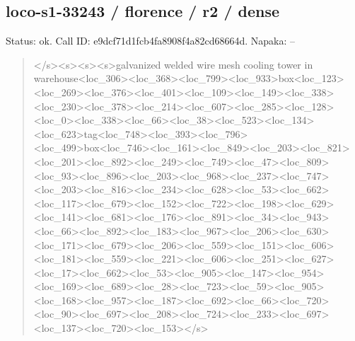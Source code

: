 \documentclass[10pt,a4paper]{article}
\begin{document}
\subsection*{loco-s1-33243 / florence / r2 / dense}
Status: ok. Call ID: e9dcf71d1fcb4fa8908f4a82cd68664d. Napaka: --
\begin{quote}\footnotesize
</s>\allowbreak{}<s>\allowbreak{}<s>\allowbreak{}<s>\allowbreak{}galvanized welded wire mesh cooling tower in warehouse<loc\_306>\allowbreak{}<loc\_368>\allowbreak{}<loc\_\allowbreak{}799>\allowbreak{}<loc\_933>\allowbreak{}box<loc\_123>\allowbreak{}<loc\_26\allowbreak{}9>\allowbreak{}<loc\_376>\allowbreak{}<loc\_401>\allowbreak{}<loc\_109>\allowbreak{}<lo\allowbreak{}c\_149>\allowbreak{}<loc\_338>\allowbreak{}<loc\_230>\allowbreak{}<loc\_378\allowbreak{}>\allowbreak{}<loc\_214>\allowbreak{}<loc\_607>\allowbreak{}<loc\_285>\allowbreak{}<loc\allowbreak{}\_128>\allowbreak{}<loc\_0>\allowbreak{}<loc\_338>\allowbreak{}<loc\_66>\allowbreak{}<lo\allowbreak{}c\_38>\allowbreak{}<loc\_523>\allowbreak{}<loc\_134>\allowbreak{}<loc\_623>\allowbreak{}\allowbreak{}tag<loc\_748>\allowbreak{}<loc\_393>\allowbreak{}<loc\_796>\allowbreak{}<l\allowbreak{}oc\_499>\allowbreak{}box<loc\_746>\allowbreak{}<loc\_161>\allowbreak{}<loc\allowbreak{}\_849>\allowbreak{}<loc\_203>\allowbreak{}<loc\_821>\allowbreak{}<loc\_201>\allowbreak{}\allowbreak{}<loc\_892>\allowbreak{}<loc\_249>\allowbreak{}<loc\_749>\allowbreak{}<loc\_\allowbreak{}47>\allowbreak{}<loc\_809>\allowbreak{}<loc\_93>\allowbreak{}<loc\_896>\allowbreak{}<lo\allowbreak{}c\_203>\allowbreak{}<loc\_968>\allowbreak{}<loc\_237>\allowbreak{}<loc\_747\allowbreak{}>\allowbreak{}<loc\_203>\allowbreak{}<loc\_816>\allowbreak{}<loc\_234>\allowbreak{}<loc\allowbreak{}\_628>\allowbreak{}<loc\_53>\allowbreak{}<loc\_662>\allowbreak{}<loc\_117>\allowbreak{}<\allowbreak{}loc\_679>\allowbreak{}<loc\_152>\allowbreak{}<loc\_722>\allowbreak{}<loc\_1\allowbreak{}98>\allowbreak{}<loc\_629>\allowbreak{}<loc\_141>\allowbreak{}<loc\_681>\allowbreak{}<l\allowbreak{}oc\_176>\allowbreak{}<loc\_891>\allowbreak{}<loc\_34>\allowbreak{}<loc\_943\allowbreak{}>\allowbreak{}<loc\_66>\allowbreak{}<loc\_892>\allowbreak{}<loc\_183>\allowbreak{}<loc\_\allowbreak{}967>\allowbreak{}<loc\_206>\allowbreak{}<loc\_630>\allowbreak{}<loc\_171>\allowbreak{}<\allowbreak{}loc\_679>\allowbreak{}<loc\_206>\allowbreak{}<loc\_559>\allowbreak{}<loc\_1\allowbreak{}51>\allowbreak{}<loc\_606>\allowbreak{}<loc\_181>\allowbreak{}<loc\_559>\allowbreak{}<l\allowbreak{}oc\_221>\allowbreak{}<loc\_606>\allowbreak{}<loc\_251>\allowbreak{}<loc\_62\allowbreak{}7>\allowbreak{}<loc\_17>\allowbreak{}<loc\_662>\allowbreak{}<loc\_53>\allowbreak{}<loc\_\allowbreak{}905>\allowbreak{}<loc\_147>\allowbreak{}<loc\_954>\allowbreak{}<loc\_169>\allowbreak{}<\allowbreak{}loc\_689>\allowbreak{}<loc\_28>\allowbreak{}<loc\_723>\allowbreak{}<loc\_59\allowbreak{}>\allowbreak{}<loc\_905>\allowbreak{}<loc\_168>\allowbreak{}<loc\_957>\allowbreak{}<loc\allowbreak{}\_187>\allowbreak{}<loc\_692>\allowbreak{}<loc\_66>\allowbreak{}<loc\_720>\allowbreak{}<\allowbreak{}loc\_90>\allowbreak{}<loc\_697>\allowbreak{}<loc\_208>\allowbreak{}<loc\_72\allowbreak{}4>\allowbreak{}<loc\_233>\allowbreak{}<loc\_697>\allowbreak{}<loc\_137>\allowbreak{}<lo\allowbreak{}c\_720>\allowbreak{}<loc\_153>\allowbreak{}</s>\allowbreak{}

\end{quote}
\end{document}
